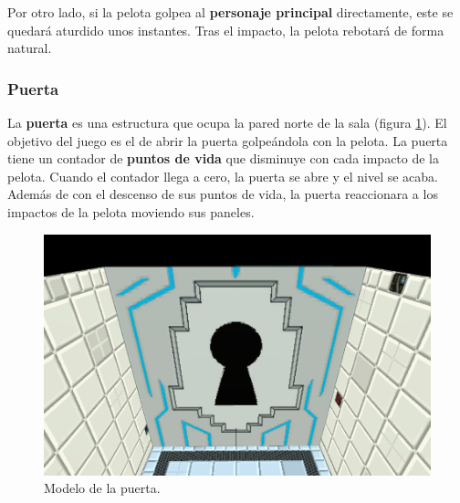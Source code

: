 Por otro lado, si la pelota golpea al \textbf{personaje principal} directamente, este se quedará aturdido unos instantes. Tras el impacto, la pelota rebotará de forma natural.

\subsubsection{Puerta}
La \textbf{puerta} es una estructura que ocupa la pared norte de la sala (figura \ref{puerta}). El objetivo del juego es el de abrir la puerta golpeándola con la pelota. La puerta tiene un contador de \textbf{puntos de vida} que disminuye con cada impacto de la pelota. Cuando el contador llega a cero, la puerta se abre y el nivel se acaba. Además de con el descenso de sus puntos de vida, la puerta reaccionara a los impactos de la pelota moviendo sus paneles.
\begin{figure}[h]
	\includegraphics[width=1\textwidth]{images/estructura/fisica/puerta}
	\centering
	\caption{Modelo de la puerta.}
	\label{puerta}
\end{figure}

